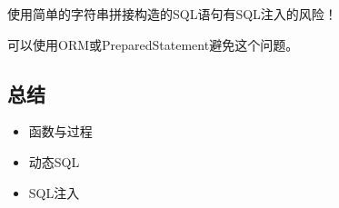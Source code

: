 \documentclass[aspectratio=169, 14pt]{beamer}
\begin{document}
{
\begin{frame}[standout]
	使用简单的字符串拼接构造的SQL语句有SQL注入的风险！

	可以使用ORM或PreparedStatement避免这个问题。
\end{frame}
}


\begin{frame}[fragile]
	\section{\textcolor{darkmidnightblue}{总结}}

	\begin{itemize}
		\item 函数与过程
		\item 动态SQL
		\item SQL注入
	\end{itemize}
\end{frame}

%
\end{document}
